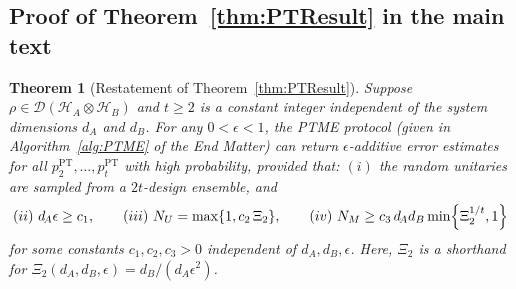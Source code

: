 \documentclass[aps,prl,twocolumn,nofootinbib,superscriptaddress,10pt]{revtex4-2}
\let\originalleft\left
\let\originalright\right
\renewcommand{\left}{\mathopen{}\mathclose\bgroup\originalleft}
\renewcommand{\right}{\aftergroup\egroup\originalright}
\theoremstyle{plain}
\newtheorem{theorem}[thm]{Theorem}
\theoremstyle{definition}
\newcommand{\PT}{\mathrm{PT}}
\newcommand{\caH}{\mathcal{H}}
\newcommand{\caD}{\mathcal{D}}
\newcommand{\tref}[1]{Theorem~\ref{#1}}
\begin{document}
\subsection{Proof of \tref{thm:PTResult} in the main text}\label{sec:ProofthmPTResult}







\begin{theorem}[Restatement of \tref{thm:PTResult}]
\label{thm:PTResultSM}%
Suppose $\rho\in\caD(\caH_A\otimes \caH_B)$ and 
$t\geq 2$ is a constant integer independent of the system dimensions $d_A$ and $d_B$.
For any $0<\epsilon<1$, the PTME protocol (given in  Algorithm~\ref{alg:PTME} of the End Matter) can return $\epsilon$-additive error estimates for all 
$p_2^{\PT},\dots,p_t^{\PT}\!$ with high probability, provided that: $(i)$ the random unitaries are sampled from a $2t$-design ensemble, and
\begin{align} 
(ii)\ d_{\!A}\epsilon\geq c_1,
\qquad 
(iii)\ N_U=\max\left\lbrace 1, c_2 \,\Xi_2 \right\rbrace, 
\qquad 
(iv)\ N_M\geq c_3\,d_{\!A} d_B \min\left\lbrace \Xi_2^{1/t}, 1 \right\rbrace
\end{align}
for some constants $c_1,c_2,c_3>0$ independent of $d_A,d_B,\epsilon$. Here, $\Xi_2$ is a shorthand for $\Xi_2(d_A,d_B,\epsilon)=d_B/(d_{A}\epsilon^2)$. 
\end{theorem}
\end{document}
